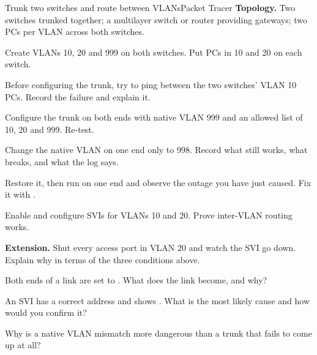 \begin{lab}{Trunk two switches and route between VLANs}{Packet Tracer}
\textbf{Topology.} Two switches trunked together; a multilayer switch or router
providing gateways; two PCs per VLAN across both switches.

\begin{tasks}
  \item Create VLANs 10, 20 and 999 on both switches. Put PCs in 10 and 20 on
        each switch.
  \item Before configuring the trunk, try to ping between the two switches'
        VLAN 10 PCs. Record the failure and explain it.
  \item Configure the trunk on both ends with native VLAN 999 and an allowed list
        of 10, 20 and 999. Re-test.
  \item Change the native VLAN on one end only to 998. Record what still works,
        what breaks, and what the log says.
  \item Restore it, then run  on one end
        and observe the outage you have just caused. Fix it with .
  \item Enable  and configure SVIs for VLANs 10 and 20. Prove
        inter-VLAN routing works.
  \item \textbf{Extension.} Shut every access port in VLAN 20 and watch the SVI
        go down. Explain why in terms of the three conditions above.
\end{tasks}
\end{lab}

\begin{checkpoint}
\begin{tightnum}
  \item Both ends of a link are set to . What does the link
        become, and why?
  \item An SVI has a correct address and shows . What is the most
        likely cause and how would you confirm it?
  \item Why is a native VLAN mismatch more dangerous than a trunk that fails to
        come up at all?
\end{tightnum}
\end{checkpoint}

